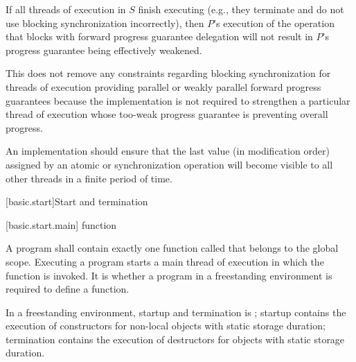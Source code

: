 \pnum
\begin{note}
If all threads of execution in $S$ finish executing (e.g., they terminate
and do not use blocking synchronization incorrectly), then $P$'s execution
of the operation that blocks with forward progress guarantee delegation will not
result in $P$'s progress guarantee being effectively weakened.
\end{note}

\pnum
\begin{note}
This does not remove any constraints regarding blocking synchronization for
threads of execution providing parallel or weakly parallel forward progress
guarantees because the implementation is not required to strengthen a particular
thread of execution whose too-weak progress guarantee is preventing overall progress.
\end{note}

\pnum
An implementation should ensure that the last value (in modification order)
assigned by an atomic or synchronization operation will become visible to all
other threads in a finite period of time.%
%

[basic.start]{Start and termination}

[basic.start.main]{ function}

\pnum
{}%
A program shall contain exactly one function called 
that belongs to the global scope.
Executing a program starts a main thread of execution
in which the  function is invoked.
%
It is 
whether a program in a freestanding environment is required to define a 
function.
\begin{note}
In a freestanding environment, startup and termination is
; startup contains the
execution of constructors for non-local objects with static storage duration;
termination contains the execution of destructors for objects with static storage
duration.
\end{note}

